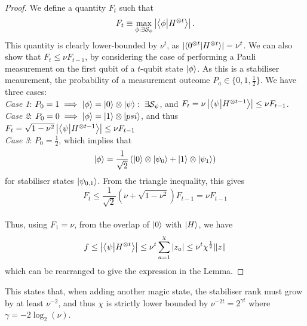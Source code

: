 \documentclass{standalone}
\begin{document}
\begin{proof}
We define a quantity $F_{t}$ such that
\[F_{t}\equiv\max_{\phi:\exists\mathcal{S}_{\phi}}\left|\braket{\phi}{H^{\otimes t}}\right|.\]
This quantity is clearly lower-bounded by $\nu^{t}$, as $\left|\braket{0^{\otimes t}}{H^{\otimes t}}\right|=\nu^{t}$. We can also show that $F_{t}\leq\nu F_{t-1}$, by considering the case of performing a Pauli measurement on the first qubit of a $t$-qubit state $\ket{\phi}$. As this is a stabiliser meaurement, the probability of a measurement outcome $P_{a}\in\{0,1,\frac{1}{2}\}$. We have three cases:\\
\emph{Case 1}: $P_{0}=1\implies\ket{\phi}=\ket{0}\otimes\ket{\psi}:\;\exists\mathcal{S}_{\psi}$, and $F_{t}=\nu\left|\braket{\psi}{H^{\otimes t-1}}\right|\leq\nu F_{t-1}$.\\
\emph{Case 2}: $P_{0}=0\implies\ket{\phi}=\ket{1}\otimes\ket{psi}$, and thus $F_{t}=\sqrt{1-\nu^{2}}\left|\braket{\psi}{H^{\otimes t-1}}\right|\leq\nu F_{t-1}$\\
\emph{Case 3}: $P_{0}=\frac{1}{2}$, which implies that 
\[\ket{\phi}=\frac{1}{\sqrt{2}}\left(\ket{0}\otimes\ket{\psi_{0}}+\ket{1}\otimes\ket{\psi_{1}}\right)\]
for stabiliser states $\ket{\psi_{0,1}}$. From the triangle inequality, this gives
\[F_{t}\leq\frac{1}{\sqrt{2}}\left(\nu+\sqrt{1-\nu^{2}}\right)F_{t-1}=\nu F_{t-1}\]\\
Thus, using $F_{1}=\nu$, from the overlap of $\ket{0}$ with $\ket{H}$, we have
\[f\leq\left|\braket{\psi}{H^{\otimes t}}\right|\leq\nu^{t}\sum_{a=1}^{\chi}\vert z_{a}\vert\leq\nu^{t}\chi^{\frac{1}{2}}\norm{z}\]
which can be rearranged to give the expression in the Lemma.
\end{proof}
This states that, when adding another magic state, the stabiliser rank must grow by at least $\nu^{-2}$, and thus $\chi$ is strictly lower bounded by $\nu^{-2t}=2^{\gamma t}$ where $\gamma=-2\log_{2}\left(\nu\right)$.
\end{document}
